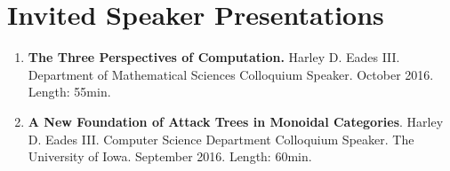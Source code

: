 \documentclass[11pt]{article}
\begin{document}
      
      

      

  \section{Invited Speaker Presentations}
    \label{subsec:invited_speaker}
    \begin{enumerate}
    \item[] \textbf{The Three Perspectives of Computation.} Harley
      D. Eades III. Department of Mathematical Sciences Colloquium
      Speaker. October 2016. Length: 55min.
      
    \item[] \textbf{A New Foundation of Attack Trees in Monoidal
      Categories}. Harley D. Eades III. Computer Science Department
      Colloquium Speaker.  The University of Iowa. September
      2016. Length: 60min.      
    \end{enumerate}
    
\end{document}
